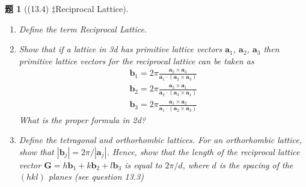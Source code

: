 \documentclass[UTF8,10pt,a4paper]{article}
\theoremstyle{Problem}
\newtheorem{prob}{题}
\theoremstyle{Solution}
\providecommand{\abs}[1]{\left\lvert#1\right\rvert}
\begin{document}
\begin{prob}[(13.4) $\ddagger$Reciprocal Lattice]
    \begin{enumerate}
        \item[(a)] Define the term Reciprocal Lattice.
        \item[(b)] Show that if a lattice in 3d has primitive lattice vectors $\bm{a}_1$, $\bm{a}_2$, $\bm{a}_3$ then primitive lattice vectors for the reciprocal lattice can be taken as
        \begin{gather*}
            \bm{b}_1=2\pi\frac{\bm{a}_2\times\bm{a}_3}{\bm{a}_1\cdot(\bm{a}_2\times\bm{a}_3)}\tag{13.13}\\
            \bm{b}_2=2\pi\frac{\bm{a}_3\times\bm{a}_1}{\bm{a}_2\cdot(\bm{a}_3\times\bm{a}_1)}\tag{13.14}\\
            \bm{b}_3=2\pi\frac{\bm{a}_1\times\bm{a}_2}{\bm{a}_1\cdot(\bm{a}_2\times\bm{a}_3)}\tag{13.15}
        \end{gather*}
        What is the proper formula in 2d?
        \item[(c)] Define the tetragonal and orthorhombic lattices. For an orthorhombic lattice, show that $\abs{\bm{b}_j}=2\pi/\abs{\bm{a}_j}$. Hence, show that the length of the reciprocal lattice vector $\bm{G}=h\bm{b}_1+k\bm{b}_2+l\bm{b}_3$ is equal to $2\pi/d$, where $d$ is the spacing of the $(hkl)$ planes (see question 13.3)
    \end{enumerate}
\end{prob}
\end{document}
